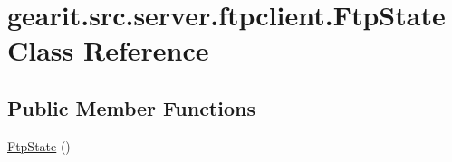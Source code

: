\hypertarget{classgearit_1_1src_1_1server_1_1ftpclient_1_1_ftp_state}{\section{gearit.\+src.\+server.\+ftpclient.\+Ftp\+State Class Reference}
\label{classgearit_1_1src_1_1server_1_1ftpclient_1_1_ftp_state}
}
\subsection*{Public Member Functions}
\begin{DoxyCompactItemize}
\item 
\hyperlink{classgearit_1_1src_1_1server_1_1ftpclient_1_1_ftp_state_a21c073a71767232db50b1f234cf8fefe}{Ftp\+State} ()
\end{DoxyCompactItemize}
